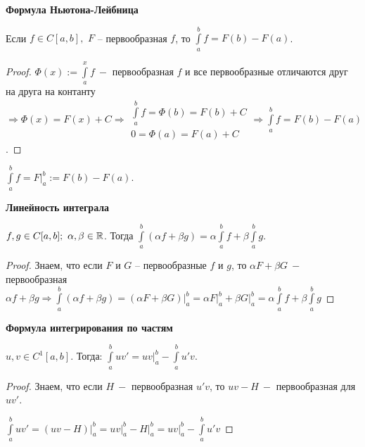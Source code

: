 \begin{theorem}
    \textbf{Формула Ньютона-Лейбница}

    Если $f\in C[a, b],$ $F$ – первообразная $f$, то $\int\limits_a^b f =F(b)-F(a)$.
\end{theorem}

\begin{proof}
    $\Phi(x):= \int\limits_a^x f\ -$ первообразная $f$ и все первообразные отличаются друг на друга на контанту $\Rightarrow \Phi(x)=F(x)+C\Rightarrow \begin{matrix*}
        \int\limits_a^b f =\Phi(b) = F(b)+C \\
        0=\Phi(a)=F(a)+C
    \end{matrix*}\Rightarrow \int\limits_a^b f = F(b)-F(a)$.
\end{proof}

\begin{designation}
    $\int\limits_a^b f=\left. F\right|_a^b := F(b)-F(a)$.
\end{designation}

\begin{theorem}
    \textbf{Линейность интеграла}

    $f, g\in C[a, b];\ \alpha, \beta\in \mathbb{R}$. Тогда $\int\limits_a^b (\alpha f + \beta g)= \alpha \int\limits_a^b f + \beta\int\limits_a^b g$.
\end{theorem}

\begin{proof}
    Знаем, что если $F$ и $G$ – первообразные $f$ и $g$, то $\alpha F + \beta G\ -$ первообразная $\alpha f + \beta g\Rightarrow \int\limits_a^b (\alpha f + \beta g)=\left.(\alpha F + \beta G)\right|_a^b=\left.\alpha F\right|_a^b+\left.\beta G\right|_a^b=\alpha \int\limits_a^b f + \beta \int\limits_a^b g$
\end{proof}

\begin{theorem}
    \textbf{Формула интегрирования по частям}

    $u, v\in C^1[a, b]$. Тогда: $\int\limits_a^b uv'=\left.uv\right|_a^b-\int\limits_a^b u'v$.
\end{theorem}

\begin{proof}
    Знаем, что если $H\ -$ первообразная $u'v$, то $uv-H\ -$ первообразная для $uv'$.

    $\int\limits_a^b uv'=\left.(uv-H)\right|_a^b=\left.uv\right|_a^b - \left.H\right|_a^b=\left.uv\right|_a^b-\int\limits_a^b u'v$
\end{proof}

